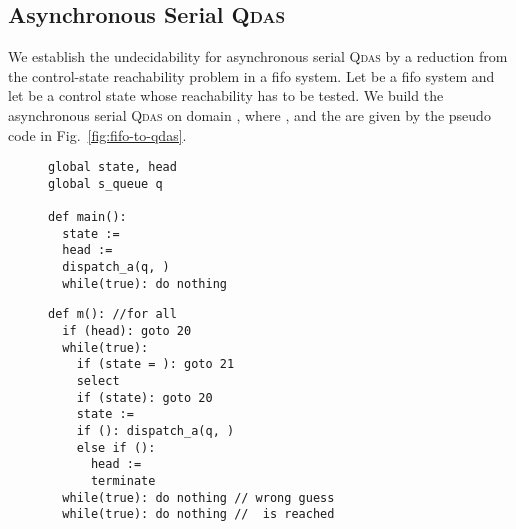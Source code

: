 \documentclass[runningheads,oribibl,]{article}
\newcommand{\qdas}{\textsc{Qdas}\xspace}
\newcommand{\fifo}{fifo\xspace}
\begin{document}
\subsection{Asynchronous Serial \qdas}
 We
establish the undecidability for asynchronous serial \qdas  by a reduction from the control-state  reachability
problem in a \fifo system. Let  be a
\fifo system and let  be a control state whose reachability
has to be tested. We build the asynchronous serial \qdas
 on domain , where ,
 and the  are
given by the pseudo code in Fig.~\ref{fig:fifo-to-qdas}.
\begin{figure}[t]
  \centering
    \begin{minipage}[t]{.45\linewidth}
      \begin{lstlisting}
global state, head
global s_queue q

def main():
  state := 
  head := 
  dispatch_a(q, )
  while(true): do nothing
      \end{lstlisting}

      \begin{minipage}{0.8\textwidth}
    \end{minipage}

    \end{minipage}
    \begin{minipage}[t]{.5\linewidth}
      \begin{lstlisting}[firstnumber=last]
def m(): //for all 
  if (head): goto 20
  while(true):
    if (state = ): goto 21
    select 
    if (state): goto 20
    state := 
    if (): dispatch_a(q, )
    else if ():
      head := 
      terminate
  while(true): do nothing // wrong guess
  while(true): do nothing //  is reached
      \end{lstlisting}
    \end{minipage}

    \begin{tikzpicture}
  [zstd/.style={state,font=\tiny},zstd2/.style={zstd,rectangle},anchor=west]


\end{tikzpicture}
\end{figure}
\end{document}
